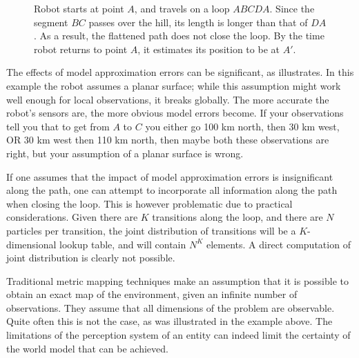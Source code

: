 \begin{figure}[htbp]
  \centering

\caption[Effect of unmodelled environment features on localisation]
{Robot starts at point $A$, and travels on a loop
$ABCDA$. Since the segment $BC$ passes over the hill, its length
is longer than that of $DA$. As a result, the flattened path does not
close the loop. By the time robot returns to point $A$, it
estimates its position to be at $A'$.}
  \label{fig:hump}
\end{figure}


The effects of model approximation errors can be significant, as
 illustrates. In this example the robot assumes a
planar surface; while this assumption might work well enough for local
observations, it breaks globally. The more accurate the robot's
sensors are, the more obvious model errors become. If your
observations tell you that to get from $A$ to $C$ you either go 100 km
north, then 30 km west, OR 30 km west then 110 km north, then maybe
both these observations are right, but your assumption of a planar
surface is wrong.

If one assumes that the impact of model approximation errors is
insignificant along the path, one can attempt to incorporate all
information along the path when closing the loop. This is however
problematic due to practical considerations. Given there are $K$
transitions along the loop, and there are $N$ particles per
transition, the joint distribution of transitions will be a
$K$-dimensional lookup table, and will contain $N^K$ elements. A
direct computation of joint distribution is clearly not possible.

Traditional metric mapping techniques make an assumption that it is
possible to obtain an exact map of the environment, given an infinite
number of observations. They assume that all dimensions of the problem
are observable. Quite often this is not the case, as was illustrated in
the example above. The limitations of the perception system of an entity
can indeed limit the certainty of the world model that can be achieved.

